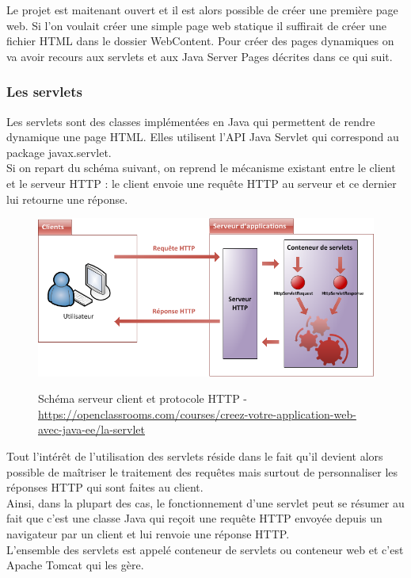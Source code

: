 Le projet est maitenant ouvert et il est alors possible de créer une première page web. Si l'on voulait créer une simple page web statique il suffirait de créer une fichier HTML dans le dossier WebContent. Pour créer des pages dynamiques on va avoir recours aux servlets et aux Java Server Pages décrites dans ce qui suit.


\subsubsection{Les servlets}
Les servlets sont des classes implémentées en Java qui permettent de rendre dynamique une page HTML. Elles utilisent l'API Java Servlet qui correspond au package javax.servlet.\\

Si on repart du schéma suivant, on reprend le mécanisme existant entre le client et le serveur HTTP : le client envoie une requête HTTP au serveur et ce dernier lui retourne une réponse.\\
\begin{figure}[H]
  \center
  \includegraphics[scale=0.5]{../graph/serveurclient.png} \\
  \caption{Schéma serveur client et protocole HTTP - \url{https://openclassrooms.com/courses/creez-votre-application-web-avec-java-ee/la-servlet}}
\end{figure}

Tout l'intérêt de l'utilisation des servlets réside dans le fait qu'il devient alors possible de maîtriser le traitement des requêtes mais surtout de personnaliser les réponses HTTP qui sont faites au client.\\
Ainsi, dans la plupart des cas, le fonctionnement d'une servlet peut se résumer au fait que c'est une classe Java qui reçoit une requête HTTP envoyée depuis un navigateur par un client et lui renvoie une réponse HTTP.\\
L'ensemble des servlets est appelé conteneur de servlets ou conteneur web et c'est Apache Tomcat qui les gère.

